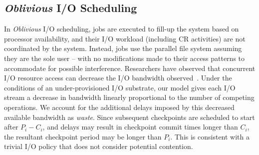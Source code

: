 \documentclass[conference,nofonttune]{IEEEtran}
\newcommand{\period}[1]{P_{#1}}
\newcommand{\ckpt}[1]{C_{#1}}
\newcommand{\dca}[1]{\todo[inline]{DCA: #1}}
\newcommand{\nocoop}{\emph{Oblivious}\xspace}
\def\propfixed{\nocoop-Fixed\xspace}
\def\propdaly{\nocoop-Daly\xspace}
\begin{document}


\subsection{\nocoop I/O Scheduling}

In \nocoop I/O scheduling, jobs are executed to fill-up the system based on
processor availability, and their I/O workload (including CR activities) are
not coordinated by the system.  Instead, jobs use the parallel file system
assuming they are the sole user -- with no modifications made to their access
patterns to accommodate for possible interference. Researchers have observed
that concurrent I/O resource access can decrease the I/O bandwidth
observed~\cite{Dorier2015}.  Under the conditions of an under-provisioned I/O
substrate, our model gives each I/O stream a decrease in bandwidth linearly
proportional to the number of competing operations.  We account for the
additional delays imposed by this decreased available bandwidth as
\emph{waste}.  Since subsequent checkpoints are scheduled to start after
$\period{i}-\ckpt{i}$, and delays may result in checkpoint commit times longer
than $\ckpt{i}$, the resultant checkpoint period may be longer than
$\period{i}$. This is consistent with a trivial I/O policy that does not
consider potential contention.

\end{document}

